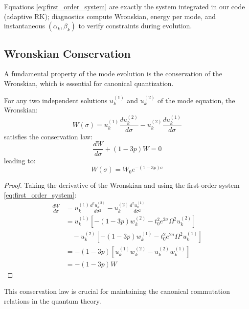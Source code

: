 Equations \eqref{eq:first_order_system} are exactly the system integrated in our code (adaptive RK); diagnostics compute Wronskian, energy per mode, and instantaneous $(\alpha_k, \beta_k)$ to verify constraints during evolution.

\subsection{Wronskian Conservation}
\label{subsec:wronskian_conservation}

A fundamental property of the mode evolution is the conservation of the Wronskian, which is essential for canonical quantization.

\begin{theorem}
\label{thm:wronskian_conservation}
For any two independent solutions $u_k^{(1)}$ and $u_k^{(2)}$ of the mode equation, the Wronskian:
\begin{equation}
W(\sigma) = u_k^{(1)} \frac{d u_k^{(2)}}{d\sigma} - u_k^{(2)} \frac{d u_k^{(1)}}{d\sigma}
\end{equation}
satisfies the conservation law:
\begin{equation}
\frac{dW}{d\sigma} + (1-3p) W = 0
\end{equation}
leading to:
\begin{equation}
W(\sigma) = W_0 e^{-(1-3p)\sigma}
\label{eq:wronskian_evolution}
\end{equation}
\end{theorem}

\begin{proof}
Taking the derivative of the Wronskian and using the first-order system \eqref{eq:first_order_system}:
\begin{align}
\frac{dW}{d\sigma} &= u_k^{(1)} \frac{d^2 u_k^{(2)}}{d\sigma^2} - u_k^{(2)} \frac{d^2 u_k^{(1)}}{d\sigma^2} \\
&= u_k^{(1)} \left[ -(1-3p) w_k^{(2)} - t_0^2 e^{2\sigma} \Omega^2 u_k^{(2)} \right] \\
&\quad - u_k^{(2)} \left[ -(1-3p) w_k^{(1)} - t_0^2 e^{2\sigma} \Omega^2 u_k^{(1)} \right] \\
&= -(1-3p) \left[ u_k^{(1)} w_k^{(2)} - u_k^{(2)} w_k^{(1)} \right] \\
&= -(1-3p) W
\end{align}
\end{proof}

This conservation law is crucial for maintaining the canonical commutation relations in the quantum theory.

